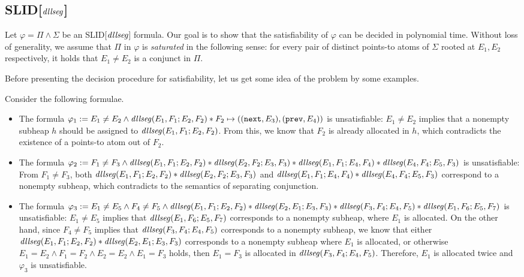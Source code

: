 \documentclass{llncs}
\begin{document}
\subsection{SLID[$\mathit{dllseg}$]}

Let $\varphi = \Pi \wedge \Sigma$ be an SLID[$\mathit{dllseg}$] formula. Our goal is to show that the satisfiability of $\varphi$ can be decided in polynomial time. Without loss of generality, we assume that $\Pi$ in $\varphi$ is \emph{saturated} in the following sense: for every pair of distinct points-to atoms of $\Sigma$ rooted at $E_1,E_2$ respectively, it holds that $E_1 \neq E_2$ is a conjunct in $\Pi$.

Before presenting the decision procedure for satisfiability, let us get some idea of the problem by some examples.

\begin{example}\label{exmp-dllseg-sat}
Consider the following formulae.
\begin{itemize}
\item The formula $\varphi_1:= E_1 \neq E_2 \wedge \mathit{dllseg}(E_1,F_1; E_2, F_2) \ast F_2 \mapsto ((\mathtt{next},E_3),(\mathtt{prev},E_4))$ is unsatisfiable: $E_1 \neq E_2$ implies that a nonempty subheap $h$ should be assigned to $\mathit{dllseg}(E_1, F_1; E_2, F_2)$. From this, we know that $F_2$ is already allocated in $h$, which contradicts the existence of a points-to atom out of $F_2$.
%
\item The formula $\varphi_2 := F_1 \neq F_3 \wedge \mathit{dllseg}(E_1, F_1; E_2, F_2) \ast  \mathit{dllseg}(E_2, F_2; E_3, F_3) \ast \mathit{dllseg}(E_1, F_1; E_4, F_4) \ast \mathit{dllseg}(E_4, F_4; E_5, F_3)$ is unsatisfiable: From $F_1 \neq F_3$,  both $\mathit{dllseg}(E_1, F_1; E_2, F_2) \ast  \mathit{dllseg}(E_2, F_2; E_3, F_3)$ and $\mathit{dllseg}(E_1, F_1; E_4, F_4) \ast \mathit{dllseg}(E_4, F_4; E_5, F_3)$ correspond to a nonempty subheap, which contradicts to the semantics of separating conjunction.
%
\item The formula $\varphi_3 := E_1 \neq E_5 \wedge F_4 \neq F_5 \wedge \mathit{dllseg}(E_1, F_1; E_2, F_2) \ast \mathit{dllseg}(E_2, E_1; E_3, F_3) \ast \mathit{dllseg}(F_3, F_4; E_4, F_5) \ast \mathit{dllseg}(E_1, F_6; E_5, F_7)$ is unsatisfiable: $E_1 \neq E_5$ implies that $\mathit{dllseg}(E_1, F_6; E_5, F_7)$ corresponds to a nonempty subheap, where $E_1$ is allocated. On the other hand, since $F_4 \neq F_5$ implies that $\mathit{dllseg}(F_3, F_4; E_4, F_5)$ corresponds to a nonempty subheap, we know that either $\mathit{dllseg}(E_1, F_1; E_2, F_2) \ast \mathit{dllseg}(E_2, E_1; E_3, F_3)$ corresponds to a nonempty subheap where $E_1$ is allocated, or otherwise $E_1 = E_2 \wedge F_1 = F_2 \wedge E_2 = E_2 \wedge E_1 = F_3$ holds, then $E_1=F_3$ is allocated in $\mathit{dllseg}(F_3, F_4; E_4, F_5)$. Therefore, $E_1$ is allocated twice and $\varphi_3$ is unsatisfiable.
\end{itemize}
\end{example}
\end{document}
